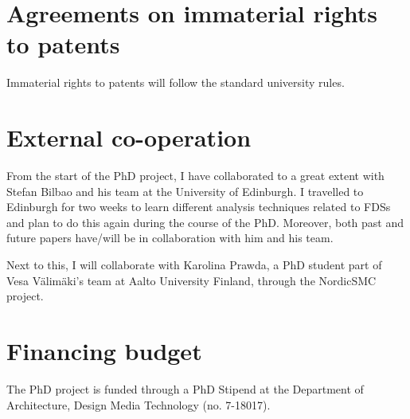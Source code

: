 \section{Agreements on immaterial rights to patents}
Immaterial rights to patents will follow the standard university rules.

\section{External co-operation}
From the start of the PhD project,  I have collaborated to a great extent with Stefan Bilbao and his team at the University of Edinburgh. I travelled to Edinburgh for two weeks to learn different analysis techniques related to FDSs and plan to do this again during the course of the PhD. Moreover, both past and future papers have/will be in collaboration with him and his team.

Next to this, I will collaborate with Karolina Prawda, a PhD student part of Vesa V\"alim\"aki's team at Aalto University Finland, through the NordicSMC project.

\section{Financing budget}
The PhD project is funded through a PhD Stipend at the Department of Architecture, Design Media Technology (no. 7-18017).
